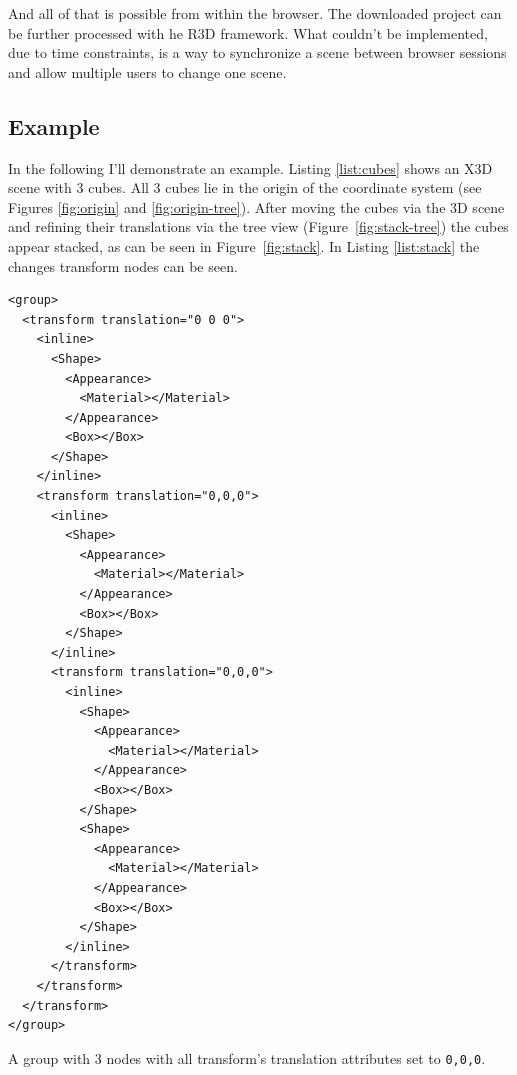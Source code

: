 And all of that is possible from within the browser.
The downloaded project can be further processed with he R3D framework.
What couldn't be implemented, due to time constraints, is a way to synchronize a scene between browser sessions and allow multiple users to change one scene.

\subsection{Example}

In the following I'll demonstrate an example. Listing \ref{list:cubes} shows an X3D scene with 3 cubes. All 3 cubes lie in the origin of the coordinate system (see Figures \ref{fig:origin} and \ref{fig:origin-tree}).
After moving the cubes via the 3D scene and refining their translations via the tree view (Figure~\ref{fig:stack-tree}) the cubes appear stacked, as can be seen in Figure~\ref{fig:stack}.
In Listing \ref{list:stack} the changes transform nodes can be seen.

\begin{listing}
  \begin{verbatim}
<group>
  <transform translation="0 0 0">
    <inline>
      <Shape>
        <Appearance>
          <Material></Material>
        </Appearance>
        <Box></Box>
      </Shape>
    </inline>
    <transform translation="0,0,0">
      <inline>
        <Shape>
          <Appearance>
            <Material></Material>
          </Appearance>
          <Box></Box>
        </Shape>
      </inline>
      <transform translation="0,0,0">
        <inline>
          <Shape>
            <Appearance>
              <Material></Material>
            </Appearance>
            <Box></Box>
          </Shape>
          <Shape>
            <Appearance>
              <Material></Material>
            </Appearance>
            <Box></Box>
          </Shape>
        </inline>
      </transform>
    </transform>
  </transform>
</group>
  \end{verbatim}
  \caption{A group with 3 nodes with all transform's translation attributes set to \texttt{0,0,0}.}
  \label{list:cubes}
\end{listing}

